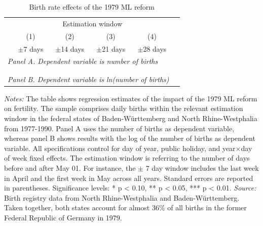 \documentclass[11pt, a4paper, draft]{article} %
\begin{document}
\restoregeometry
 \vspace*{\fill}
 \begin{table}[H] \centering
 \caption{Birth rate effects of the 1979 ML reform}\label{tab: validity_birth_rate}
 {\def\sym#1{\ifmmode^{#1}\else\(^{#1}\)\fi} 
 \begin{tabular}{l*{5}{c}}
 	\toprule
 	& \multicolumn{4}{c}{Estimation window} \\
 	\cmidrule{2-5}
 	&\multicolumn{1}{c}{(1)}&\multicolumn{1}{c}{(2)}&\multicolumn{1}{c}{(3)}&\multicolumn{1}{c}{(4)}\\
	 & \multicolumn{1}{c}{$\pm$7 days} & \multicolumn{1}{c}{$\pm$14 days} & \multicolumn{1}{c}{$\pm$21 days} & \multicolumn{1}{c}{$\pm$28 days}\\ 
 	\midrule
 	\multicolumn{5}{l}{\emph{Panel A. Dependent variable is number of births}}\\
 	
 	\\ \\
 	\multicolumn{5}{l}{\emph{Panel B. Dependent variable is ln(number of births)}}\\
 	
 	\bottomrule
 \end{tabular}}
 \begin{minipage}{0.7\linewidth}
 		\scriptsize \emph{Notes:} The table shows regression estimates of the impact of the 1979 ML reform on fertility. The sample comprises daily births within the relevant estimation window in the federal states of Baden-Württemberg and North Rhine-Westphalia from 1977-1990. Panel A uses the number of births as dependent variable, whereas panel B shows results with the log of the number of births as dependent variable. All specifications control for day of year, public holiday, and year$\times$day of week fixed effects. The estimation window is referring to the number of days before and after May 01. For instance, the $\pm$ 7 day window includes the last week in April and the first week in May across all years. Standard errors are reported in parentheses. \newline Significance levels: * p < 0.10, ** p < 0.05, *** p < 0.01. \newline\emph{Source:} Birth registry data from North Rhine-Westphalia and Baden-Württemberg. Taken together, both states account for almost 36\% of all births in the former Federal Republic of Germany in 1979.
 	\end{minipage}
 \end{table}
 \vspace*{\fill}\clearpage 
\end{document}
